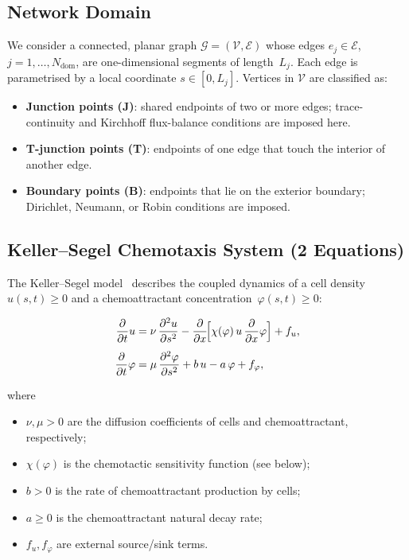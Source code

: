\documentclass[11pt,a4paper]{article}
\newcommand{\ddt}{\frac{\partial}{\partial t}}
\newcommand{\ddx}{\frac{\partial}{\partial x}}
\begin{document}
\subsection{Network Domain}

We consider a connected, planar graph
$\mathcal{G} = (\mathcal{V},\mathcal{E})$
whose edges $e_j\in\mathcal{E}$, $j=1,\dots,N_{\mathrm{dom}}$,
are one-dimensional segments of length~$L_j$.
Each edge is parametrised by a local coordinate
$s\in[0,L_j]$.  Vertices in $\mathcal{V}$ are classified as:
\begin{itemize}
  \item \textbf{Junction points (J)}: shared endpoints of two or more
        edges; trace-continuity and Kirchhoff flux-balance conditions
        are imposed here.
  \item \textbf{T-junction points (T)}: endpoints of one edge that
        touch the interior of another edge.
  \item \textbf{Boundary points (B)}: endpoints that lie on the
        exterior boundary; Dirichlet, Neumann, or Robin conditions
        are imposed.
\end{itemize}

\subsection{Keller--Segel Chemotaxis System (2 Equations)}

The Keller--Segel model~\cite{keller1970initiation,perthame2007transport}
describes the coupled dynamics of a cell density~$u(s,t)\geq 0
$ and a chemoattractant concentration~$\varphi(s,t)\geq 0$:
%
\begin{mathbox}[title={Keller--Segel system}]
\begin{align}
  \ddt u &= \nu\,\frac{\partial^2 u}{\partial s^2}
            - \ddx\!\Bigl[\chi(\varphi)\,u\,\ddx\varphi\Bigr]
            + f_u,
  \label{eq:ks-u}\\[4pt]
  \ddt \varphi &= \mu\,\frac{\partial^2 \varphi}{\partial s^2}
                  + b\,u - a\,\varphi + f_\varphi,
  \label{eq:ks-phi}
\end{align}
\end{mathbox}
\noindent
where
\begin{itemize}
  \item $\nu,\mu>0$ are the diffusion coefficients of cells and
        chemoattractant, respectively;
  \item $\chi(\varphi)$ is the chemotactic sensitivity function
        (see below);
  \item $b>0$ is the rate of chemoattractant production by cells;
  \item $a\geq 0$ is the chemoattractant natural decay rate;
  \item $f_u,f_\varphi$ are external source/sink terms.
\end{itemize}
\end{document}
